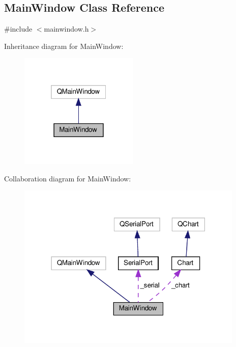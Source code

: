 \hypertarget{classMainWindow}{}\subsection{Main\+Window Class Reference}
\label{classMainWindow}


{\ttfamily \#include $<$mainwindow.\+h$>$}



Inheritance diagram for Main\+Window\+:\nopagebreak
\begin{figure}[H]
\begin{center}
\leavevmode
\includegraphics[width=160pt]{classMainWindow__inherit__graph}
\end{center}
\end{figure}


Collaboration diagram for Main\+Window\+:\nopagebreak
\begin{figure}[H]
\begin{center}
\leavevmode
\includegraphics[width=306pt]{classMainWindow__coll__graph}
\end{center}
\end{figure}
